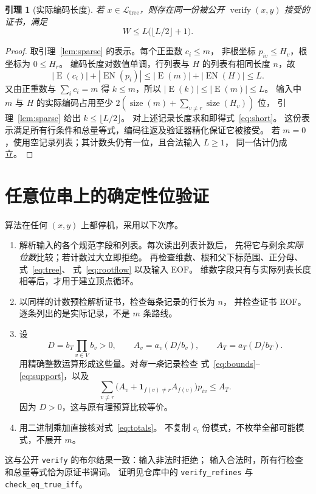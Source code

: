 \documentclass[UTF8,11pt]{ctexart}
\newtheorem{lemma}[theorem]{引理}
\newcommand{\size}{\operatorname{size}}
\newcommand{\enc}{\operatorname{E}}
\newcommand{\verify}{\operatorname{verify}}
\newcommand{\Lang}{\mathcal L_{\mathrm{tree}}}
\begin{document}
\begin{lemma}[实际编码长度]\label{lem:wire}
若 $x\in\Lang$，则存在同一份被公开 $\verify(x,y)$ 接受的证书，满足
\begin{equation}\label{eq:short}
 W\le L\bigl(\lfloor L/2\rfloor+1\bigr).
\end{equation}
\end{lemma}
\begin{proof}
取引理~\ref{lem:sparse} 的表示。每个正重数 $c_i\le m$，
非根坐标 $p_{iv}\le H_v$，根坐标为 $0\le H_r$。
编码长度对数值单调，行列表与 $H$ 的列表有相同长度 $n$，故
\[
 |\enc(c_i)|+|\operatorname{EN}(p_i)|
 \le |\enc(m)|+|\operatorname{EN}(H)|\le L.
\]
又由正重数与 $\sum_i c_i=m$ 得 $k\le m$，所以
$|\enc(k)|\le |\enc(m)|\le L$。
输入中 $m$ 与 $H$ 的实际编码占用至少
$2(\size(m)+\sum_{v\ne r}\size(H_v))$ 位，
引理~\ref{lem:sparse} 给出 $k\le\lfloor L/2\rfloor$。
对上述记录长度求和即得式~\eqref{eq:short}。
这份表示满足所有行条件和总量等式，编码往返及验证器精化保证它被接受。
若 $m=0$，使用空记录列表；其计数头仍有一位，且合法输入 $L\ge1$，
同一估计仍成立。
\end{proof}

\section{任意位串上的确定性位验证}

算法在任何 $(x,y)$ 上都停机，采用以下次序。
\begin{enumerate}
\item 解析输入的各个规范字段和列表。每次读出列表计数后，
先将它与剩余\emph{实际位数}比较；若计数过大立即拒绝。
再检查维数、根和父下标范围、正分母、式~\eqref{eq:tree}、
式~\eqref{eq:rootflow} 以及输入 EOF。
维数字段只有与实际列表长度相等后，才用于建立顶点循环。
\item 以同样的计数预检解析证书，检查每条记录的行长为 $n$，
并检查证书 EOF。逐条列出的是实际记录，不是 $m$ 条路线。
\item 设
\[
 D=b_T\prod_{v\in V}b_v>0,\qquad
 A_v=a_v(D/b_v),\qquad A_T=a_T(D/b_T).
\]
用精确整数运算形成这些量。对\emph{每一条}记录检查
式~\eqref{eq:bounds}--\eqref{eq:support}，以及
\[
 \sum_{v\ne r}\bigl(A_v+\mathbf{1}_{f(v)\ne r}A_{f(v)}\bigr)p_{iv}\le A_T.
\]
因为 $D>0$，这与原有理预算比较等价。
\item 用二进制乘加直接核对式~\eqref{eq:totals}。
不复制 $c_i$ 份模式，不枚举全部可能模式，不展开 $m$。
\end{enumerate}
这与公开 \texttt{verify} 的布尔结果一致：输入非法时拒绝；
输入合法时，所有行检查和总量等式恰为原证书谓词。
证明见仓库中的 \texttt{verify\_refines} 与
\texttt{check\_eq\_true\_iff}。
\end{document}
